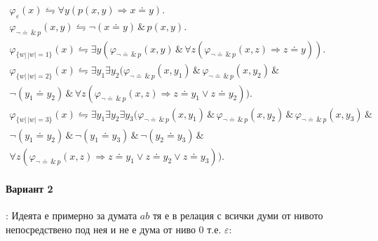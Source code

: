 \documentclass[12pt]{article}
\def\Land{\,\&\,}
\begin{document}
\begin{addmargin}[1em]{2em}
    \begin{gather*}
        \varphi_{\varepsilon}(x) \leftrightharpoons \forall y(p(x,y) \Rightarrow x \doteq y).\\
        \varphi_{\neg\doteq\Land p }(x,y)\leftrightharpoons \neg(x\doteq y) \Land p(x,y).\\
        \varphi_{\{w|\,| w |=1\}}(x) \leftrightharpoons \exists y (\varphi_{\neg\doteq\Land p }(x,y) \Land \forall z (\varphi_{\neg\doteq\Land p }(x,z) \Rightarrow z \doteq y)).\\
        \varphi_{\{w|\,| w |=2\}}(x) \leftrightharpoons \exists y_1 \exists y_2 (\varphi_{\neg\doteq\Land p }(x,y_1) \Land \varphi_{\neg\doteq\Land p }(x,y_2) \Land \\\neg(y_1 \doteq y_2) \Land \forall z (\varphi_{\neg\doteq\Land p }(x,z) \Rightarrow z \doteq y_1 \lor z \doteq y_2)).\\
        \varphi_{\{w|\,| w |=3\}}(x) \leftrightharpoons \exists y_1 \exists y_2 \exists y_3 (\varphi_{\neg\doteq\Land p }(x,y_1) \Land \varphi_{\neg\doteq\Land p }(x,y_2) \Land \varphi_{\neg\doteq\Land p }(x,y_3) \Land \\\neg(y_1 \doteq y_2) \Land \neg(y_1 \doteq y_3) \Land \neg(y_2 \doteq y_3) \Land  \\ \forall z (\varphi_{\neg\doteq\Land p }(x,z) \Rightarrow z \doteq y_1 \lor z \doteq y_2 \lor z \doteq y_3)).
    \end{gather*}
\end{addmargin}

\paragraph{\hspace{0.5em} Вариант 2}:
Идеята е примерно за думата $ab$ тя е в релация с всички думи от нивото непосредствено под нея и не е дума от ниво 0 т.е. $\varepsilon$:
\vskip 0.2in
\begin{addmargin}[1em]{2em}
\begin{center}
\end{center}
\end{addmargin}
\end{document}
